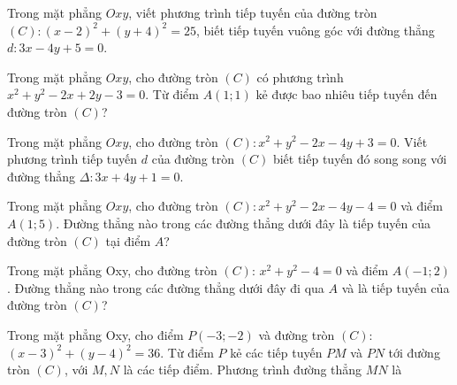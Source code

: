 \documentclass[12pt,a4paper]{book}
\begin{document}
\begin{ex}
Trong mặt phẳng $Oxy$, viết phương trình tiếp tuyến của đường tròn $(C): (x-2)^2 + (y+4)^2 = 25$, biết tiếp tuyến vuông góc với đường thẳng $d : 3x - 4y + 5 = 0$.
\loigiai{}
\end{ex}

\begin{ex}
Trong mặt phẳng $Oxy$, cho đường tròn $(C)$ có phương trình $x^2 + y^2 - 2x + 2y - 3 = 0$. Từ điểm $A(1;1)$ kẻ được bao nhiêu tiếp tuyến đến đường tròn $(C)$?
\loigiai{}
\end{ex}

\begin{ex}
Trong mặt phẳng $Oxy$, cho đường tròn $(C): x^2 + y^2 - 2x - 4y + 3 = 0$. Viết phương trình tiếp tuyến $ d $ của đường tròn $(C)$ biết tiếp tuyến đó song song với đường thẳng $\Delta : 3x + 4y + 1 = 0$.
\loigiai{}
\end{ex}

\begin{ex}
Trong mặt phẳng $Oxy$, cho đường tròn $(C): x^2 + y^2 - 2x - 4y - 4 = 0$ và điểm $A(1;5)$. Đường thẳng nào trong các đường thẳng dưới đây là tiếp tuyến của đường tròn $(C)$ tại điểm $A$?
\loigiai{}
\end{ex}

\begin{ex}
Trong mặt phẳng Oxy, cho đường tròn $(C)$: $x^2 + y^2 - 4 = 0$ và điểm $A(-1;2)$. Đường thẳng nào trong các đường thẳng dưới đây đi qua $A$ và là tiếp tuyến của đường tròn $(C)$?
\loigiai{}
\end{ex}

\begin{ex}
Trong mặt phẳng Oxy, cho điểm $P(-3;-2)$ và đường tròn $(C)$: $(x-3)^2 + (y-4)^2 = 36$. Từ điểm $P$ kẻ các tiếp tuyến $PM$ và $PN$ tới đường tròn $(C)$, với $M, N$ là các tiếp điểm. Phương trình đường thẳng $MN$ là
\loigiai{}
\end{ex}
\end{document}
